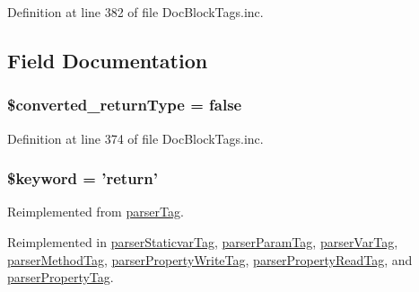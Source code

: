 \-Definition at line 382 of file \-Doc\-Block\-Tags.\-inc.




\subsection{\-Field \-Documentation}
\hypertarget{classparser_return_tag_a15683ef9d58ead6e8f6af3d7cc050bcd}{
\subsubsection[{\$converted\-\_\-return\-Type}]{\setlength{\rightskip}{0pt plus 5cm}\$converted\-\_\-return\-Type = false}}\label{classparser_return_tag_a15683ef9d58ead6e8f6af3d7cc050bcd}


\-Definition at line 374 of file \-Doc\-Block\-Tags.\-inc.

\hypertarget{classparser_return_tag_a4a925d6b38bcf3957c713a7d3dc7da1f}{
\subsubsection[{\$keyword}]{\setlength{\rightskip}{0pt plus 5cm}\$keyword = '{\bf return}'}}\label{classparser_return_tag_a4a925d6b38bcf3957c713a7d3dc7da1f}


\-Reimplemented from \hyperlink{classparser_tag_a4a925d6b38bcf3957c713a7d3dc7da1f}{parser\-Tag}.



\-Reimplemented in \hyperlink{classparser_staticvar_tag_a4a925d6b38bcf3957c713a7d3dc7da1f}{parser\-Staticvar\-Tag}, \hyperlink{classparser_param_tag_a4a925d6b38bcf3957c713a7d3dc7da1f}{parser\-Param\-Tag}, \hyperlink{classparser_var_tag_a4a925d6b38bcf3957c713a7d3dc7da1f}{parser\-Var\-Tag}, \hyperlink{classparser_method_tag_a4a925d6b38bcf3957c713a7d3dc7da1f}{parser\-Method\-Tag}, \hyperlink{classparser_property_write_tag_a4a925d6b38bcf3957c713a7d3dc7da1f}{parser\-Property\-Write\-Tag}, \hyperlink{classparser_property_read_tag_a4a925d6b38bcf3957c713a7d3dc7da1f}{parser\-Property\-Read\-Tag}, and \hyperlink{classparser_property_tag_a4a925d6b38bcf3957c713a7d3dc7da1f}{parser\-Property\-Tag}.



